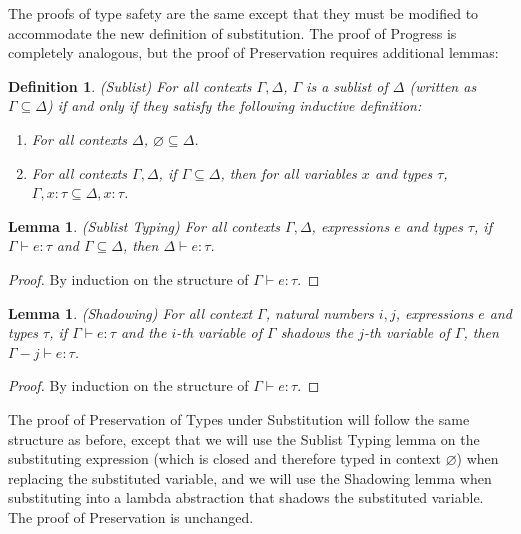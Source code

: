 \documentclass[12pt, letterpaper]{article}
\newtheorem{lemma}[theorem]{Lemma}
\newtheorem{definition}[theorem]{Definition}
\begin{document}
\begin{flushleft}
The proofs of type safety are the same except that they must be modified to accommodate the new definition of substitution. The proof of Progress is completely analogous, but the proof of Preservation requires additional lemmas:
\begin{definition}
(Sublist) For all contexts $\Gamma, \Delta$, $\Gamma$ is a sublist of $\Delta$ (written as $\Gamma \subseteq \Delta$) if and only if they satisfy the following inductive definition:
\begin{enumerate}[1.]
	\item For all contexts $\Delta$, $\varnothing \subseteq \Delta$.
	\item For all contexts $\Gamma, \Delta$, if $\Gamma \subseteq \Delta$, then for all variables $x$ and types $\tau$, $\Gamma, x:\tau \subseteq \Delta, x:\tau$.
\end{enumerate}
\end{definition}
\begin{lemma}
(Sublist Typing) For all contexts $\Gamma, \Delta$, expressions $e$ and types $\tau$, if $\Gamma \vdash e : \tau$ and $\Gamma \subseteq \Delta$, then $\Delta \vdash e : \tau$.
\end{lemma}
\begin{proof}
By induction on the structure of $\Gamma \vdash e : \tau$.
\end{proof}

\begin{lemma}
(Shadowing) For all context $\Gamma$, natural numbers $i, j$, expressions $e$ and types $\tau$, if $\Gamma \vdash e : \tau$ and the $i$-th variable of $\Gamma$ shadows the $j$-th variable of $\Gamma$, then $\Gamma - j \vdash e : \tau$.
\end{lemma}
\begin{proof}
By induction on the structure of $\Gamma \vdash e : \tau$.
\end{proof}

The proof of Preservation of Types under Substitution will follow the same structure as before, except that we will use the Sublist Typing lemma on the substituting expression (which is closed and therefore typed in context $\varnothing$) when replacing the substituted variable, and we will use the Shadowing lemma when substituting into a lambda abstraction that shadows the substituted variable. The proof of Preservation is unchanged.
\end{flushleft}


\end{document}
